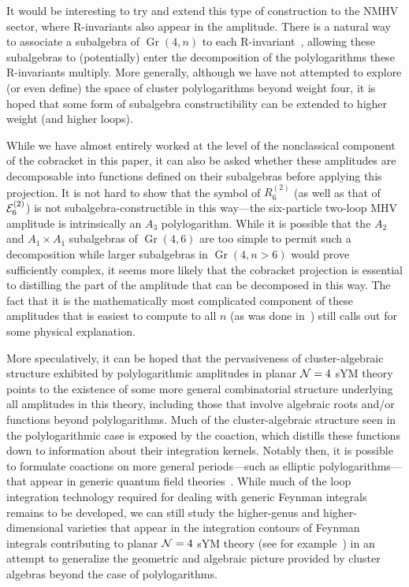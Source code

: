 \documentclass[12pt]{article}
\DeclareMathOperator{\Gr}{Gr}
\begin{document}
It would be interesting to try and extend this type of construction to the NMHV sector, where R-invariants also appear in the amplitude. There is a natural way to associate a subalgebra of $\Gr(4,n)$ to each R-invariant~\cite{Drummond:2018dfd}, allowing these subalgebras to (potentially) enter the decomposition of the polylogarithms these R-invariants multiply. More generally, although we have not attempted to explore (or even define) the space of cluster polylogarithms beyond weight four, it is hoped that some form of subalgebra constructibility can be extended to higher weight (and higher loops). 

While we have almost entirely worked at the level of the nonclassical component of the cobracket in this paper, it can also be asked whether these amplitudes are decomposable into functions defined on their subalgebras before applying this projection. It is not hard to show that the symbol of $R_6^{(2)}$ (as well as that of ${\cal E}_6^{(2)}$) is not subalgebra-constructible in this way---the six-particle two-loop MHV amplitude is intrinsically an $A_3$ polylogarithm. While it is possible that the $A_2$ and $A_1 \times A_1$ subalgebras of $\Gr(4,6)$ are too simple to permit such a decomposition while larger subalgebras in $\Gr(4,n>6)$ would prove sufficiently complex, it seems more likely that the cobracket projection is essential to distilling the part of the amplitude that can be decomposed in this way. The fact that it is the mathematically most complicated component of these amplitudes that is easiest to compute to all $n$ (as was done in~\cite{Golden:2014pua}) still calls out for some physical explanation.

More speculatively, it can be hoped that the pervasiveness of cluster-algebraic structure exhibited by polylogarithmic amplitudes in planar ${\cal N} = 4$ sYM theory points to the existence of some more general combinatorial structure underlying all amplitudes in this theory, including those that involve algebraic roots and/or functions beyond polylogarithms. Much of the cluster-algebraic structure seen in the polylogarithmic case is exposed by the coaction, which distills these functions down to information about their integration kernels. Notably then, it is possible to formulate coactions on more general periods---such as elliptic polylogarithms---that appear in generic quantum field theories~\cite{2015arXiv151206410B,Abreu:2017enx,Abreu:2017mtm,Broedel:2017kkb,Caron-Huot:2018dsv,Broedel:2018iwv}. While much of the loop integration technology required for dealing with generic Feynman integrals remains to be developed, we can still study the higher-genus and higher-dimensional varieties that appear in the integration contours of Feynman integrals contributing to planar ${\cal N} = 4$ sYM theory (see for example~\cite{Bourjaily:2017bsb,Bourjaily:2018ycu,Bourjaily:2018yfy}) in an attempt to generalize the geometric and algebraic picture provided by cluster algebras beyond the case of polylogarithms.
\end{document}
